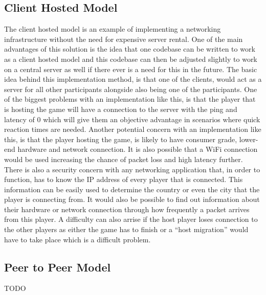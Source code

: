 \subsection{Client Hosted Model}
The client hosted model is an example of implementing a networking infrastructure without the need for expensive server rental. One of the main advantages of this solution is the idea that one codebase can be written to work as a client hosted model and this codebase can then be adjusted slightly to work on a central server as well if there ever is a need for this in the future. The basic idea behind this implementation method, is that one of the clients, would act as a server for all other participants alongside also being one of the participants. One of the biggest problems with an implementation like this, is that the player that is hosting the game will have a connection to the server with the ping and latency of 0 which will give them an objective advantage in scenarios where quick reaction times are needed. Another potential concern with an implementation like this, is that the player hosting the game, is likely to have consumer grade, lower-end hardware and network connection. It is also possible that a WiFi connection would be used increasing the chance of packet loss and high latency further. There is also a security concern with any networking application that, in order to function, has to know the IP address of every player that is connected. This information can be easily used to determine the country or even the city that the player is connecting from. It would also be possible to find out information about their hardware or network connection through how frequently a packet arrives from this player. A difficulty can also arrise if the host player loses connection to the other players as either the game has to finish or a ``host migration'' would have to take place which is a difficult problem.




\subsection{Peer to Peer Model}
TODO



